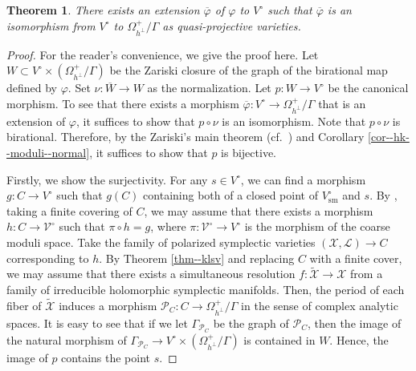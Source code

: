 \documentclass[12pt,twoside]{amsart}
\newtheorem{thm}{Theorem}[section]
\theoremstyle{definition}
\begin{document}
\begin{thm}\label{thm--period--mapping--HK}
    There exists an extension $\overline{\varphi}$ of $\varphi$ to $V^\circ$ such that $\overline{\varphi}$ is an isomorphism from $V^\circ$ to $\Omega_{h^{\perp}}^+/\Gamma$ as quasi-projective varieties.
\end{thm} 

\begin{proof}
    For the reader's convenience, we give the proof here.
    Let $W\subset V^\circ\times (\Omega_{h^{\perp}}^+/\Gamma)$ be the Zariski closure of the graph of the birational map defined by $\varphi$.
    Set $\nu\colon\overline{W}\to W$ as the normalization.
    Let $p\colon W\to V^\circ$ be the canonical morphism.
    To see that there exists a morphism $\overline{\varphi}\colon V^\circ\to\Omega_{h^{\perp}}^+/\Gamma$ that is an extension of $\varphi$, it suffices to show that $p\circ\nu$ is an isomorphism.
    Note that $p\circ\nu$ is birational.
    Therefore, by the Zariski's main theorem (cf.~\cite[Theorem 12.73]{gortz-wedhorn}) and Corollary \ref{cor--hk--moduli--normal}, it suffices to show that $p$ is bijective. 
    
    Firstly, we show the surjectivity.
    For any $s\in V^{\circ}$, we can find a morphism $g\colon C\to V^\circ$ such that $g(C)$ containing both of a closed point of $V^\circ_{\mathrm{sm}}$ and $s$.
    By \cite[Theorem 11.4.1]{Ols}, taking a finite covering of $C$, we may assume that there exists a morphism $h\colon C\to \mathcal{V}^\circ$ such that $\pi\circ h=g$, where $\pi\colon\mathcal{V}^\circ\to V^\circ$ is the morphism of the coarse moduli space.
    Take the family of polarized symplectic varieties $(\mathcal{X},\mathcal{L})\to C$ corresponding to $h$.
    By Theorem \ref{thm--klsv} and replacing $C$ with a finite cover, we may assume that there exists a simultaneous resolution $f\colon\widetilde{\mathcal{X}}\to\mathcal{X}$ from a family of irreducible holomorphic symplectic manifolds.
   Then, the period of each fiber of $\widetilde{\mathcal{X}}$ induces a morphism $\mathcal{P}_C\colon C\to \Omega_{h^{\perp}}^+/\Gamma$ in the sense of complex analytic spaces.  
   It is easy to see that if we let $\Gamma_{\mathcal{P}_C}$ be the graph of $\mathcal{P}_C$, then the image of the natural morphism of $\Gamma_{\mathcal{P}_C}\to V^\circ\times (\Omega_{h^{\perp}}^+/\Gamma)$ is contained in $W$. 
   Hence, the image of $p$ contains the point $s$.


\end{proof}
\end{document}

